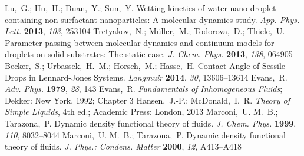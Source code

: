 \documentclass[journal=langd5,manuscript=article]{achemso}
\begin{document}
\begin{mcitethebibliography}{71}
Lu,~G.; Hu,~H.; Duan,~Y.; Sun,~Y. Wetting kinetics of water nano-droplet
  containing non-surfactant nanoparticles: A molecular dynamics study.
  \emph{App. Phys. Lett.} \textbf{2013}, \emph{103}, 253104\relax
\mciteBstWouldAddEndPuncttrue
\mciteSetBstMidEndSepPunct{\mcitedefaultmidpunct}
{\mcitedefaultendpunct}{\mcitedefaultseppunct}\relax
\EndOfBibitem
{}
Tretyakov,~N.; M{\"u}ller,~M.; Todorova,~D.; Thiele,~U. Parameter passing
  between molecular dynamics and continuum models for droplets on solid
  substrates: The static case. \emph{J. Chem. Phys.} \textbf{2013}, \emph{138},
  064905\relax
\mciteBstWouldAddEndPuncttrue
\mciteSetBstMidEndSepPunct{\mcitedefaultmidpunct}
{\mcitedefaultendpunct}{\mcitedefaultseppunct}\relax
\EndOfBibitem
{}
Becker,~S.; Urbassek,~H.~M.; Horsch,~M.; Hasse,~H. Contact Angle of Sessile
  Drops in Lennard-Jones Systems. \emph{Langmuir} \textbf{2014}, \emph{30},
  13606--13614\relax
\mciteBstWouldAddEndPuncttrue
\mciteSetBstMidEndSepPunct{\mcitedefaultmidpunct}
{\mcitedefaultendpunct}{\mcitedefaultseppunct}\relax
\EndOfBibitem
{}
Evans,~R. \emph{Adv. Phys.} \textbf{1979}, \emph{28}, 143\relax
\mciteBstWouldAddEndPuncttrue
\mciteSetBstMidEndSepPunct{\mcitedefaultmidpunct}
{\mcitedefaultendpunct}{\mcitedefaultseppunct}\relax
\EndOfBibitem
{}
Evans,~R. \emph{Fundamentals of Inhomogeneous Fluids}; Dekker: New York, 1992;
  Chapter 3\relax
\mciteBstWouldAddEndPuncttrue
\mciteSetBstMidEndSepPunct{\mcitedefaultmidpunct}
{\mcitedefaultendpunct}{\mcitedefaultseppunct}\relax
\EndOfBibitem
{}
Hansen,~J.-P.; McDonald,~I.~R. \emph{Theory of Simple Liquids}, 4th ed.;
  Academic Press: London, 2013\relax
\mciteBstWouldAddEndPuncttrue
\mciteSetBstMidEndSepPunct{\mcitedefaultmidpunct}
{\mcitedefaultendpunct}{\mcitedefaultseppunct}\relax
\EndOfBibitem
{}
Marconi,~U. M.~B.; Tarazona,~P. Dynamic density functional theory of fluids.
  \emph{J. Chem. Phys.} \textbf{1999}, \emph{110}, 8032--8044\relax
\mciteBstWouldAddEndPuncttrue
\mciteSetBstMidEndSepPunct{\mcitedefaultmidpunct}
{\mcitedefaultendpunct}{\mcitedefaultseppunct}\relax
\EndOfBibitem
{}
Marconi,~U. M.~B.; Tarazona,~P. Dynamic density functional theory of fluids.
  \emph{J. Phys.: Condens. Matter} \textbf{2000}, \emph{12}, A413--A418\relax

\end{mcitethebibliography}
\end{document}

